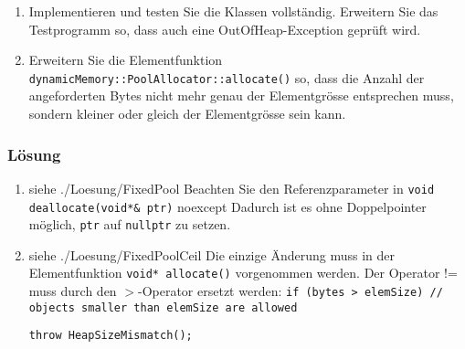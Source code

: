 \begin{enumerate}
  \item Implementieren und testen Sie die Klassen vollständig. Erweitern Sie das Testprogramm so, dass auch eine OutOfHeap-Exception geprüft wird.
\item Erweitern Sie die Elementfunktion \texttt{dynamicMemory::PoolAllocator::allocate()} so, dass die Anzahl der angeforderten Bytes nicht mehr genau der Elementgrösse entsprechen muss, sondern kleiner oder gleich der Elementgrösse sein kann.
\end{enumerate}

\subsubsection{Lösung}

\begin{enumerate}
  \item  siehe ./Loesung/FixedPool
Beachten Sie den Referenzparameter in
\texttt{void deallocate(void*\& ptr)} noexcept
Dadurch ist es ohne Doppelpointer möglich, \texttt{ptr} auf \texttt{nullptr} zu setzen.


\noindent\makebox[\linewidth]{\rule{\paperwidth}{0.4pt}}


\item  siehe ./Loesung/FixedPoolCeil
Die einzige Änderung muss in der Elementfunktion
\texttt{void* allocate()}
vorgenommen werden. Der Operator != muss durch den $>$-Operator ersetzt werden:
\texttt{if (bytes > elemSize) // objects smaller than elemSize are allowed}

\texttt{throw HeapSizeMismatch();}

\noindent\makebox[\linewidth]{\rule{\paperwidth}{0.4pt}}

\end{enumerate}


